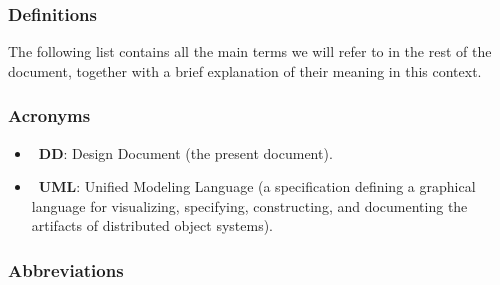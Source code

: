 \subsubsection{Definitions}

The following list contains all the main terms we will refer to in the rest of the document, together with a brief explanation of their meaning in this context.

\begin{itemize}
\end{itemize}

\subsubsection{Acronyms}

\begin{itemize}
\item~\textbf{DD}: Design Document (the present document).
\item~\textbf{UML}: Unified Modeling Language (a specification defining a graphical language for visualizing, specifying, constructing, and documenting the artifacts of distributed object systems).
\end{itemize}

\subsubsection{Abbreviations}

\begin{itemize}
\end{itemize}